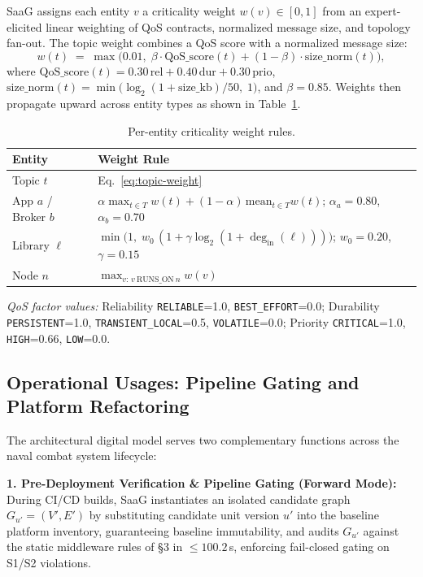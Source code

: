 \documentclass[sigconf,9pt]{acmart}
\begin{document}
SaaG assigns each entity $v$ a criticality weight $w(v) \in [0,1]$ from an expert-elicited linear weighting of QoS contracts, normalized message size, and topology fan-out. The topic weight combines a QoS score with a normalized message size:
\begin{equation}\label{eq:topic-weight}
w(t) \;=\; \max\!\Big(0.01,\; \beta\cdot\mathrm{QoS\_score}(t) + (1-\beta)\cdot\mathrm{size\_norm}(t)\Big),
\end{equation}where $\mathrm{QoS\_score}(t)=0.30\,\mathrm{rel}+0.40\,\mathrm{dur}+0.30\,\mathrm{prio}$, $\mathrm{size\_norm}(t)=\min\!\big(\log_2(1+\mathrm{size\_kb})/50,\;1\big)$, and $\beta=0.85$. Weights then propagate upward across entity types as shown in Table~\ref{tab:weights}.
\begin{table}[t]
\centering
\caption{Per-entity criticality weight rules.}
\label{tab:weights}
\small
\begin{tabularx}{\columnwidth}{l X}
\toprule
\textbf{Entity} & \textbf{Weight Rule} \\
\midrule
Topic $t$ & Eq.~\ref{eq:topic-weight} \\
App $a$ / Broker $b$ & $\alpha \max_{t\in T} w(t) + (1-\alpha)\,\mathrm{mean}_{t\in T} w(t)$; $\alpha_{a}{=}0.80$, $\alpha_{b}{=}0.70$ \\
Library $\ell$ & $\min\!\big(1,\; w_0\,(1+\gamma\log_2(1+\deg_{\mathrm{in}}(\ell)))\big)$; $w_0{=}0.20$, $\gamma{=}0.15$ \\
Node $n$ & $\max_{v:\, v\ \mathrm{RUNS\_ON}\ n} w(v)$ \\
\bottomrule
\end{tabularx}
\end{table}
\begin{footnotesize}\noindent\emph{QoS factor values:} Reliability \texttt{RELIABLE}=1.0, \texttt{BEST\_EFFORT}=0.0; Durability \texttt{PERSISTENT}=1.0, \texttt{TRANSIENT\_LOCAL}=0.5, \texttt{VOLATILE}=0.0; Priority \texttt{CRITICAL}=1.0, \texttt{HIGH}=0.66, \texttt{LOW}=0.0.\end{footnotesize}

\subsection{Operational Usages: Pipeline Gating and Platform Refactoring}

The architectural digital model serves two complementary functions across the naval combat system lifecycle:

\noindent\textbf{1. Pre-Deployment Verification \& Pipeline Gating (Forward Mode):} During CI/CD builds, SaaG instantiates an isolated candidate graph $G_{u'} = (V', E')$ by substituting candidate unit version $u'$ into the baseline platform inventory, guaranteeing baseline immutability, and audits $G_{u'}$ against the static middleware rules of \S3 in $\le 100.2$\,s, enforcing fail-closed gating on S1/S2 violations.
\end{document}
